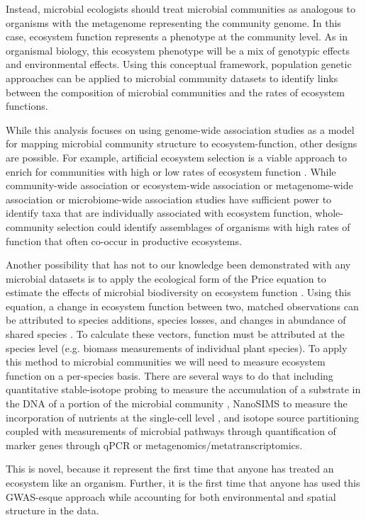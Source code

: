\documentclass{article}
\begin{document}
Instead, microbial ecologists should treat microbial communities as analogous to
organisms with the metagenome representing the community genome. In this case,
ecosystem function represents a phenotype at the community level. As in
organismal biology, this ecosystem phenotype will be a mix of genotypic effects and
environmental effects. Using this conceptual framework, population genetic
approaches can be applied to microbial community datasets to identify  links
between the composition of microbial communities and the rates of ecosystem
functions.

While this analysis focuses on using genome-wide association studies as a model
for mapping microbial community structure to ecosystem-function, other designs
are possible. For example, artificial ecosystem selection is a viable approach
to enrich for communities with high or low rates of ecosystem function
\citep{swenson2000, panke-buisse2015}. While community-wide association or
ecosystem-wide association or metagenome-wide association or microbiome-wide
association studies have sufficient power to identify taxa that are individually
associated with ecosystem function, whole-community selection could identify
assemblages of organisms with high rates of function that often co-occur in
productive ecosystems.

Another possibility that has not to our knowledge been demonstrated with any
microbial datasets is to apply the ecological form of the Price equation to
estimate the effects of microbial biodiversity on ecosystem function
\citep{fox2006, bannar-martin2018}. Using this equation, a change in ecosystem function between two, matched
observations can be attributed to species additions, species losses, and
changes in abundance of shared species \citep{fox2006,
bannar-martin2018}. To
calculate these vectors, function must be attributed at the species level (e.g.
biomass measurements of individual plant species). To apply this method to
microbial communities we will need to measure ecosystem function on a
per-species basis. There are several ways to do that including quantitative stable-isotope
probing to measure the accumulation of a substrate in the DNA of a portion of
the microbial community \citep{hungate2015}, NanoSIMS to measure the incorporation of nutrients at
the single-cell level \citep{mayali2012}, and isotope source partitioning coupled with measurements
of microbial pathways through quantification of marker genes through qPCR or
metagenomics/metatranscriptomics.

This is novel, because it represent the first time that anyone has treated an
ecosystem like an organism. Further, it is the first time that anyone has
used this GWAS-esque approach while accounting for both environmental and
spatial structure in the data. 
\end{document}
